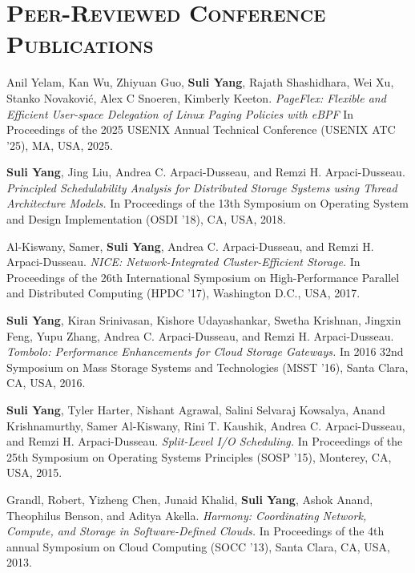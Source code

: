 \documentclass[10pt, letterpaper]{article}
\begin{document}
\section*{\textsc{Peer-Reviewed Conference Publications}}

\begin{enumerate}[fullwidth,itemindent=1.1em,label={[\arabic*]}]


        \item Anil Yelam, Kan Wu, Zhiyuan Guo, {\bf Suli Yang}, Rajath Shashidhara, Wei Xu, Stanko Novaković, Alex C Snoeren, Kimberly Keeton. \textit{{PageFlex}: Flexible and Efficient User-space Delegation of Linux Paging Policies with {eBPF}}
	In Proceedings of the 2025 USENIX Annual Technical Conference (USENIX ATC '25), MA, USA, 2025.

	\item {\bf Suli Yang}, Jing Liu, Andrea C. Arpaci-Dusseau, and Remzi H. Arpaci-Dusseau. \textit{Principled Schedulability Analysis for Distributed Storage Systems using Thread Architecture Models.}
        In Proceedings of the 13th Symposium on Operating System and Design Implementation (OSDI '18), CA, USA, 2018.

        \item Al-Kiswany, Samer, {\bf Suli Yang}, Andrea C. Arpaci-Dusseau, and Remzi H. Arpaci-Dusseau. \textit{NICE: Network-Integrated Cluster-Efficient Storage.}  
        In Proceedings of the 26th International Symposium on High-Performance Parallel and Distributed Computing (HPDC '17), Washington D.C., USA, 2017.

        \item {\bf Suli Yang}, Kiran Srinivasan, Kishore Udayashankar, Swetha Krishnan, Jingxin Feng, Yupu Zhang, Andrea C. Arpaci-Dusseau, and Remzi H. Arpaci-Dusseau. \textit{Tombolo: Performance Enhancements for Cloud Storage Gateways.} 
         In 2016 32nd Symposium on Mass Storage Systems and Technologies (MSST '16), Santa Clara, CA, USA, 2016.

         \item {\bf Suli Yang}, Tyler Harter, Nishant Agrawal, Salini Selvaraj Kowsalya, Anand Krishnamurthy, Samer Al-Kiswany, Rini T. Kaushik, Andrea C. Arpaci-Dusseau, and Remzi H. Arpaci-Dusseau. \textit{Split-Level I/O Scheduling.} 
         In Proceedings of the 25th Symposium on Operating Systems Principles (SOSP '15), Monterey, CA, USA, 2015.

         \item Grandl, Robert, Yizheng Chen, Junaid Khalid, {\bf Suli Yang}, Ashok Anand, Theophilus Benson, and Aditya Akella. \textit{Harmony: Coordinating Network, Compute, and Storage in Software-Defined Clouds.}
          In Proceedings of the 4th annual Symposium on Cloud Computing (SOCC '13), Santa Clara, CA, USA, 2013.

\end{enumerate}
\end{document}
